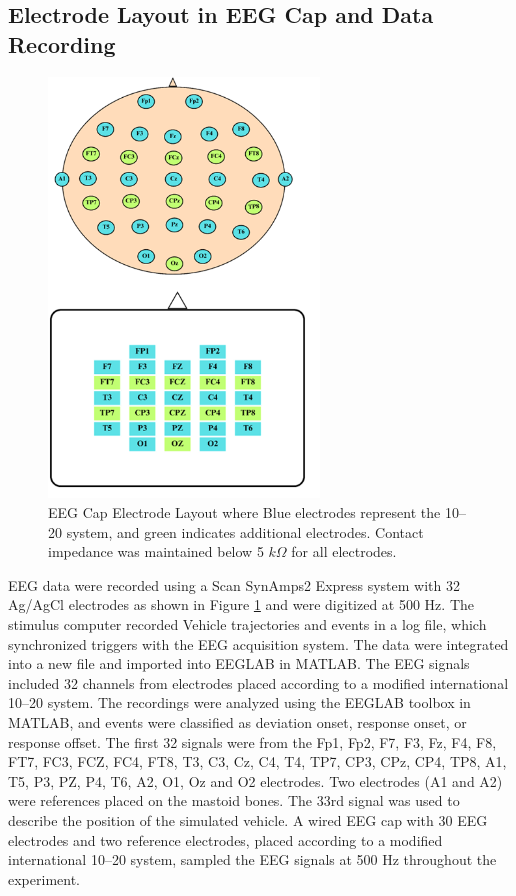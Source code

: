 \documentclass{IEEE_lsens}
\begin{document}
\subsection{Electrode Layout in EEG Cap and Data Recording}
\begin{figure}[t!]
\centering
\includegraphics[width=7.2cm,keepaspectratio=true]{Fig_data_electrode.png}
\vspace{-0.2cm}
\caption{\scriptsize EEG Cap Electrode Layout where Blue electrodes represent the 10–20 system, and green indicates additional electrodes. Contact impedance was maintained below 5 $k\Omega$ for all electrodes. \label{Fig_data_electrode}}
\end{figure}

EEG data were recorded using a Scan SynAmps2 Express system with 32 Ag/AgCl electrodes as shown in Figure \ref{Fig_data_electrode} and were digitized at 500 Hz. The stimulus computer recorded Vehicle trajectories and events in a log file, which synchronized triggers with the EEG acquisition system. The data were integrated into a new file and imported into EEGLAB in MATLAB.
The EEG signals included 32 channels from electrodes placed according to a modified international 10–20 system. The recordings were analyzed using the EEGLAB toolbox in MATLAB, and events were classified as deviation onset, response onset, or response offset.
The first 32 signals were from the Fp1, Fp2, F7, F3, Fz, F4, F8, FT7, FC3, FCZ, FC4, FT8, T3, C3, Cz, C4, T4, TP7, CP3, CPz, CP4, TP8, A1, T5, P3, PZ, P4, T6, A2, O1, Oz and O2 electrodes. Two electrodes (A1 and A2) were references placed on the mastoid bones. The 33rd signal was used to describe the position of the simulated vehicle. A wired EEG cap with 30 EEG electrodes and two reference electrodes, placed according to a modified international 10–20 system, sampled the EEG signals at 500 Hz throughout the experiment.
\end{document}
